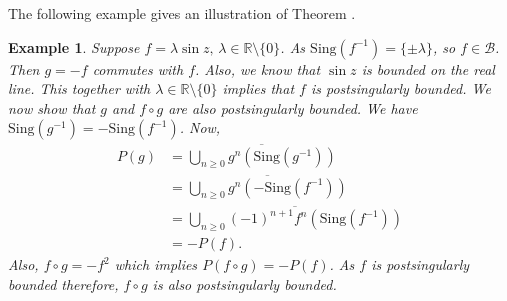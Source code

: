 \documentclass[a4paper,12pt]{amsart}
\numberwithin{equation}{section}
\newtheorem{example}[theorem]{Example}
\begin{document}
	The following example gives an illustration of Theorem .
	\begin{example}
		Suppose $f=\lambda \sin z, \, \lambda\in\mathbb{R}\setminus\{0\}$. As $\mathrm{Sing}(f^{-1})= \{\pm \lambda\}$, so $f\in \mathcal{B}$. Then  $g=-f$ commutes with $f$. Also, we know that $\sin z$ is bounded on the real line. This together with $\lambda\in\mathbb{R}\setminus\{0\}$ implies that $f$ is postsingularly bounded. We now show that $g$ and $f\circ g$ are also postsingularly bounded.
		We have $\mathrm{Sing}(g^{-1})= -\mathrm{Sing}(f^{-1})$. Now,
		\begin{align*}
			P(g)
			&= \overline {\bigcup_{n \geq 0} g^n \left( \mathrm{Sing}(g^{-1}) \right)}\\
			&= \overline {\bigcup_{n \geq 0} g^n \left( \mathrm{-Sing}(f^{-1}) \right)}\\
			&= \overline {\bigcup_{n \geq 0} (-1)^{n+1} f^{n} \left( \mathrm{Sing}(f^{-1}) \right)}\\
			&=	-P(f).
		\end{align*}
		Also, $f\circ g = -f^{2}$ which implies $P(f \circ g)= -P(f)$. As $f$ is postsingularly bounded therefore, $f \circ g$ is also postsingularly bounded.

\end{example}
\end{document}

